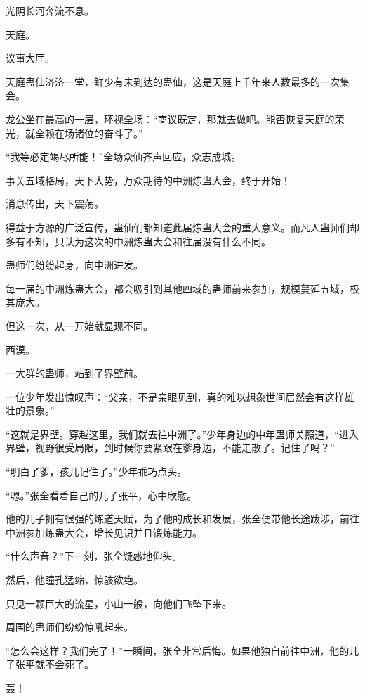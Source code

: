 
\begin{this_body}



光阴长河奔流不息。

天庭。

议事大厅。

天庭蛊仙济济一堂，鲜少有未到达的蛊仙，这是天庭上千年来人数最多的一次集会。

龙公坐在最高的一层，环视全场：“商议既定，那就去做吧。能否恢复天庭的荣光，就全赖在场诸位的奋斗了。”

“我等必定竭尽所能！”全场众仙齐声回应，众志成城。

事关五域格局，天下大势，万众期待的中洲炼蛊大会，终于开始！

消息传出，天下震荡。

得益于方源的广泛宣传，蛊仙们都知道此届炼蛊大会的重大意义。而凡人蛊师们却多有不知，只认为这次的中洲炼蛊大会和往届没有什么不同。

蛊师们纷纷起身，向中洲进发。

每一届的中洲炼蛊大会，都会吸引到其他四域的蛊师前来参加，规模蔓延五域，极其庞大。

但这一次，从一开始就显现不同。

西漠。

一大群的蛊师，站到了界壁前。

一位少年发出惊叹声：“父亲，不是亲眼见到，真的难以想象世间居然会有这样雄壮的景象。”

“这就是界壁。穿越这里，我们就去往中洲了。”少年身边的中年蛊师关照道，“进入界壁，视野很受局限，到时候你要紧跟在爹身边，不能走散了。记住了吗？”

“明白了爹，孩儿记住了。”少年乖巧点头。

“嗯。”张全看着自己的儿子张平，心中欣慰。

他的儿子拥有很强的炼道天赋，为了他的成长和发展，张全便带他长途跋涉，前往中洲参加炼蛊大会，增长见识并且锻炼能力。

“什么声音？”下一刻，张全疑惑地仰头。

然后，他瞳孔猛缩，惊骇欲绝。

只见一颗巨大的流星，小山一般，向他们飞坠下来。

周围的蛊师们纷纷惊吼起来。

“怎么会这样？我们完了！”一瞬间，张全非常后悔。如果他独自前往中洲，他的儿子张平就不会死了。

轰！


\end{this_body}
